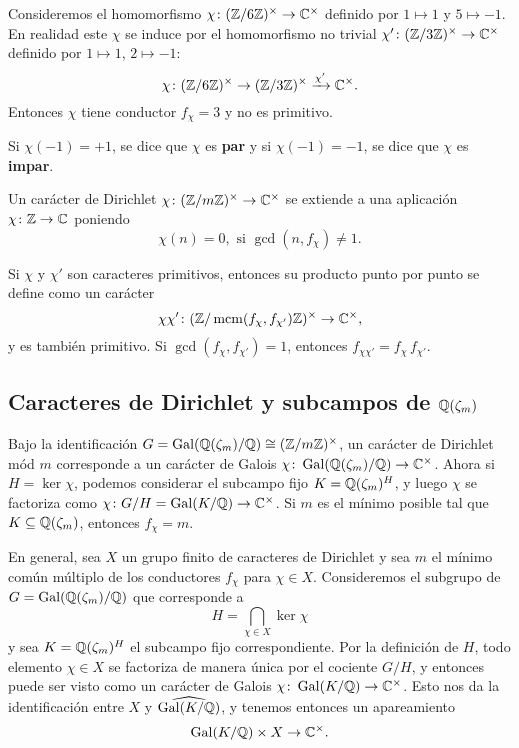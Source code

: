 \begin{ejemplo}
  Consideremos el homomorfismo $\chi\colon (\mathbb{Z}/6\mathbb{Z})^\times \to \mathbb{C}^\times$
  definido por $1 \mapsto 1$ y $5 \mapsto -1$. En realidad este $\chi$ se induce
  por el homomorfismo no trivial $\chi'\colon (\mathbb{Z}/3\mathbb{Z})^\times \to \mathbb{C}^\times$
  definido por $1 \mapsto 1$, $2 \mapsto -1$:
  $$\chi\colon (\mathbb{Z}/6\mathbb{Z})^\times \to (\mathbb{Z}/3\mathbb{Z})^\times \xrightarrow{\chi'} \mathbb{C}^\times.$$
  Entonces $\chi$ tiene conductor $f_\chi = 3$ y no es primitivo.
\end{ejemplo}

\begin{definicion}
  Si $\chi (-1) = +1$, se dice que $\chi$ es \textbf{par} y si
  $\chi (-1) = -1$, se dice que $\chi$ es \textbf{impar}.
\end{definicion}

Un carácter de Dirichlet $\chi\colon (\mathbb{Z}/m\mathbb{Z})^\times \to \mathbb{C}^\times$ se extiende
a una aplicación $\chi\colon \mathbb{Z}\to \mathbb{C}$ poniendo
$$\chi (n) = 0, \text{ si }\gcd (n,f_\chi) \ne 1.$$

Si $\chi$ y $\chi'$ son caracteres primitivos, entonces su producto punto por
punto se define como un carácter
$$\chi\chi'\colon (\mathbb{Z}/\operatorname{mcm} (f_\chi,f_{\chi'})\mathbb{Z})^\times \to \mathbb{C}^\times,$$
y es también primitivo. Si $\gcd (f_\chi,f_{\chi'}) = 1$, entonces
$f_{\chi\chi'} = f_\chi\,f_{\chi'}$.

\subsection{Caracteres de Dirichlet y subcampos de $\mathbb{Q} (\zeta_m)$}

Bajo la identificación $G = \operatorname{Gal} (\mathbb{Q} (\zeta_m)/\mathbb{Q}) \cong (\mathbb{Z}/m\mathbb{Z})^\times$,
un carácter de Dirichlet mód $m$ corresponde a un carácter de Galois
$\chi\colon \operatorname{Gal} (\mathbb{Q} (\zeta_m)/\mathbb{Q}) \to \mathbb{C}^\times$. Ahora si $H = \ker\chi$,
podemos considerar el subcampo fijo $K = \mathbb{Q} (\zeta_m)^H$, y luego $\chi$
se factoriza como $\chi\colon G/H = \operatorname{Gal} (K/\mathbb{Q}) \to \mathbb{C}^\times$. Si $m$ es el
mínimo posible tal que $K \subseteq \mathbb{Q} (\zeta_m)$, entonces $f_\chi = m$.

En general, sea $X$ un grupo finito de caracteres de Dirichlet y sea $m$ el
mínimo común múltiplo de los conductores $f_\chi$ para
$\chi \in X$. Consideremos el subgrupo de $G = \operatorname{Gal} (\mathbb{Q} (\zeta_m)/\mathbb{Q})$ que
corresponde a
$$H = \bigcap_{\chi \in X} \ker \chi$$
y sea $K = \mathbb{Q} (\zeta_m)^H$ el subcampo fijo correspondiente. Por la definición
de $H$, todo elemento $\chi\in X$ se factoriza de manera única por el cociente
$G/H$, y entonces puede ser visto como un carácter de Galois
$\chi\colon \operatorname{Gal} (K/\mathbb{Q}) \to \mathbb{C}^\times$. Esto nos da la identificación entre
$X$ y $\widehat{\operatorname{Gal} (K/\mathbb{Q})}$, y tenemos entonces un apareamiento
$$\operatorname{Gal} (K/\mathbb{Q}) \times X \to \mathbb{C}^\times.$$

